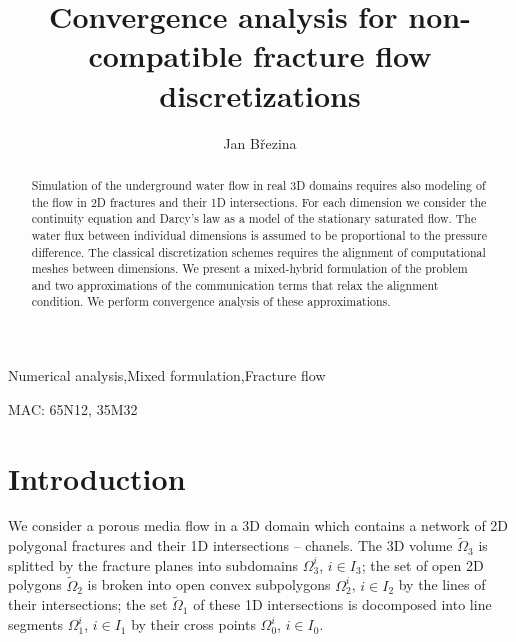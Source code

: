 \documentclass{elsart}
\begin{document}
\begin{frontmatter}
 \title{Convergence analysis
 for non-compatible fracture flow discretizations}


\author[NTI]{Jan B\v rezina}

\address[NTI]{New Technologies Institute, 
Technical University in Liberec, 
Studentsk\'a 2/1402,
461 17  Liberec, 
Czech Republic
}

\begin{abstract}
Simulation of the underground water flow in real 3D domains requires also modeling of the flow in
2D fractures and their 1D intersections. For each dimension we consider  
the continuity equation and Darcy's law as a model of the stationary saturated flow.
The water flux between individual dimensions is assumed to be proportional to the pressure difference. The classical discretization schemes requires the alignment of computational meshes between dimensions. We present a mixed-hybrid formulation of the problem and two approximations of the communication terms that relax the alignment condition.
We perform convergence analysis of these approximations.
\end{abstract}

\begin{keyword}
Numerical analysis\sep Mixed formulation\sep Fracture flow 

MAC: 65N12, 35M32
\end{keyword}

\end{frontmatter}










\section{Introduction}
We consider a porous media flow in a 3D domain which contains a network of 2D polygonal fractures and their 1D intersections -- chanels. The 3D volume $\tilde\Omega_3$ is splitted by the fracture planes into subdomains $\Omega_3^i$, $i\in I_3$; the set of open 2D polygons $\tilde\Omega_2$ is broken into open convex subpolygons $\Omega_2^i$, $i\in I_2$ by the lines of their intersections; the set $\tilde\Omega_1$ of these 1D intersections is docomposed into line segments $\Omega_1^i$, $i\in I_1$ by their cross points $\Omega_0^i$, $i\in I_0$.
\end{document}
